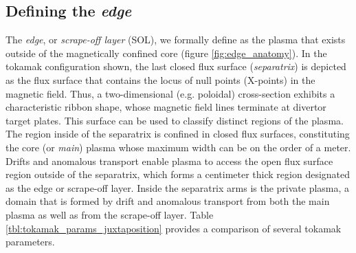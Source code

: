 \documentclass[11pt,titlepage]{report}
\begin{document}



\subsection{Defining the \emph{edge}}

\indent \indent The \emph{edge}, or \emph{scrape-off layer} (SOL), we formally define as the plasma that exists outside of the magnetically confined core (figure \ref{fig:edge_anatomy}). In the tokamak configuration shown, the last closed flux surface (\emph{separatrix}) is depicted as the flux surface that contains the locus of null points (X-points) in the magnetic field. Thus, a two-dimensional (e.g. poloidal) cross-section exhibits a characteristic ribbon shape, whose magnetic field lines terminate at divertor target plates. This surface can be used to classify distinct regions of the plasma. The region inside of the separatrix is confined in closed flux surfaces, constituting the core (or \emph{main}) plasma whose maximum width can be on the order of a meter. Drifts and anomalous transport enable plasma to access the open flux surface region outside of the separatrix, which forms a centimeter thick region designated as the edge or scrape-off layer. Inside the separatrix arms is the private plasma, a domain that is formed by drift and anomalous transport from both the main plasma as well as from the scrape-off layer. Table \ref{tbl:tokamak_params_juxtaposition} provides a comparison of several tokamak parameters. 
\end{document}
